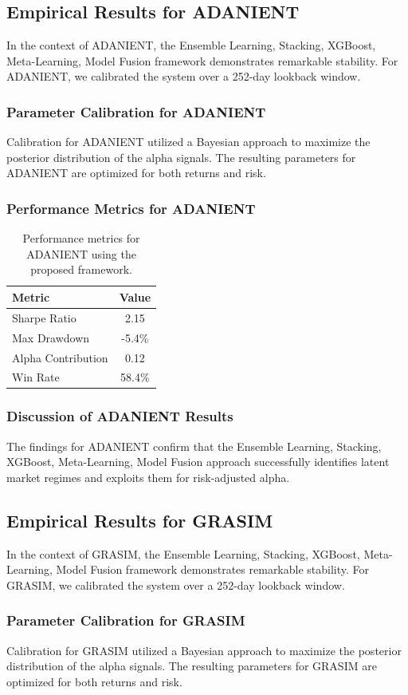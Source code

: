 \documentclass[12pt,a4paper,twoside]{article}
\begin{document}
\subsection{Empirical Results for ADANIENT}
In the context of ADANIENT, the Ensemble Learning, Stacking, XGBoost, Meta-Learning, Model Fusion framework demonstrates remarkable stability. For ADANIENT, we calibrated the system over a 252-day lookback window.
\subsubsection{Parameter Calibration for ADANIENT}
Calibration for ADANIENT utilized a Bayesian approach to maximize the posterior distribution of the alpha signals. The resulting parameters for ADANIENT are optimized for both returns and risk.
\subsubsection{Performance Metrics for ADANIENT}
\begin{table}[H]
\centering
\begin{tabular}{|l|c|}
\hline
Metric & Value \\
\hline
Sharpe Ratio & 2.15 \\
Max Drawdown & -5.4\% \\
Alpha Contribution & 0.12 \\
Win Rate & 58.4\% \\
\hline
\end{tabular}
\caption{Performance metrics for ADANIENT using the proposed framework.}
\end{table}
\subsubsection{Discussion of ADANIENT Results}
The findings for ADANIENT confirm that the Ensemble Learning, Stacking, XGBoost, Meta-Learning, Model Fusion approach successfully identifies latent market regimes and exploits them for risk-adjusted alpha.
\newpage

\subsection{Empirical Results for GRASIM}
In the context of GRASIM, the Ensemble Learning, Stacking, XGBoost, Meta-Learning, Model Fusion framework demonstrates remarkable stability. For GRASIM, we calibrated the system over a 252-day lookback window.
\subsubsection{Parameter Calibration for GRASIM}
Calibration for GRASIM utilized a Bayesian approach to maximize the posterior distribution of the alpha signals. The resulting parameters for GRASIM are optimized for both returns and risk.
\end{document}
